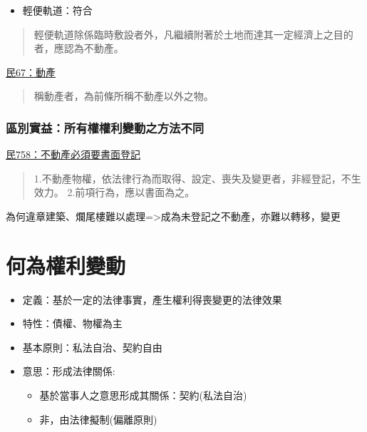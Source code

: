 \documentclass[
]{book}
\providecommand{\tightlist}{%
  \setlength{\itemsep}{0pt}\setlength{\parskip}{0pt}}
\begin{document}
\begin{itemize}
\tightlist
\item
  輕便軌道：符合
\end{itemize}

\begin{quote}
輕便軌道除係臨時敷設者外，凡繼續附著於土地而達其一定經濟上之目的者，應認為不動產。
\end{quote}

\href{https://law.moj.gov.tw/LawClass/LawSingle.aspx?pcode=B0000001\&flno=67}{民67：動產}

\begin{quote}
稱動產者，為前條所稱不動產以外之物。
\end{quote}

\hypertarget{ux5340ux5225ux5be6ux76caux6240ux6709ux6b0aux6b0aux5229ux8b8aux52d5ux4e4bux65b9ux6cd5ux4e0dux540c}{%
\subsection{區別實益：所有權權利變動之方法不同}\label{ux5340ux5225ux5be6ux76caux6240ux6709ux6b0aux6b0aux5229ux8b8aux52d5ux4e4bux65b9ux6cd5ux4e0dux540c}}

\href{https://law.moj.gov.tw/LawClass/LawSingle.aspx?pcode=B0000001\&flno=67}{民758：不動產必須要書面登記}

\begin{quote}
1.不動產物權，依法律行為而取得、設定、喪失及變更者，非經登記，不生效力。
2.前項行為，應以書面為之。
\end{quote}

為何違章建築、爛尾樓難以處理=\textgreater 成為未登記之不動產，亦難以轉移，變更

\hypertarget{ux4f55ux70baux6b0aux5229ux8b8aux52d5}{%
\chapter{何為權利變動}\label{ux4f55ux70baux6b0aux5229ux8b8aux52d5}}

\begin{itemize}
\item
  定義：基於一定的法律事實，產生權利得喪變更的法律效果
\item
  特性：債權、物權為主
\item
  基本原則：私法自治、契約自由
\item
  意思：形成法律關係:

  \begin{itemize}
  \item
    基於當事人之意思形成其關係：契約(私法自治)
  \item
    非，由法律擬制(偏離原則)
  \end{itemize}
\end{itemize}
\end{document}
